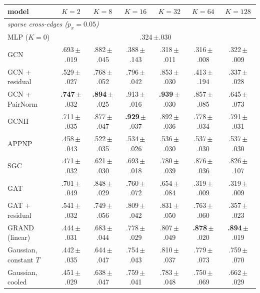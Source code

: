 \begin{tabular}{lcccccc}
\toprule
model & $K=2$ & $K=8$ & $K=16$ & $K=32$ & $K=64$ & $K=128$\\
\midrule
\multicolumn{7}{l}{\emph{sparse cross-edges ($p_x=0.05$)}}\\
MLP ($K=0$) & \multicolumn{6}{c}{.324\,{\tiny$\pm$.030}}\\
GCN & .693\,{\tiny$\pm$.019} & .882\,{\tiny$\pm$.045} & .388\,{\tiny$\pm$.143} & .318\,{\tiny$\pm$.011} & .316\,{\tiny$\pm$.008} & .322\,{\tiny$\pm$.009}\\
GCN + residual & .529\,{\tiny$\pm$.027} & .768\,{\tiny$\pm$.052} & .796\,{\tiny$\pm$.042} & .853\,{\tiny$\pm$.030} & .413\,{\tiny$\pm$.194} & .337\,{\tiny$\pm$.028}\\
GCN + PairNorm & \textbf{.747}\,{\tiny$\pm$.032} & \textbf{.894}\,{\tiny$\pm$.025} & .913\,{\tiny$\pm$.016} & \textbf{.939}\,{\tiny$\pm$.030} & .857\,{\tiny$\pm$.085} & .645\,{\tiny$\pm$.073}\\
GCNII & .711\,{\tiny$\pm$.035} & .877\,{\tiny$\pm$.047} & \textbf{.929}\,{\tiny$\pm$.037} & .892\,{\tiny$\pm$.036} & .778\,{\tiny$\pm$.034} & .791\,{\tiny$\pm$.031}\\
APPNP & .458\,{\tiny$\pm$.043} & .522\,{\tiny$\pm$.035} & .534\,{\tiny$\pm$.026} & .536\,{\tiny$\pm$.030} & .537\,{\tiny$\pm$.030} & .537\,{\tiny$\pm$.030}\\
SGC & .471\,{\tiny$\pm$.032} & .621\,{\tiny$\pm$.030} & .693\,{\tiny$\pm$.018} & .780\,{\tiny$\pm$.039} & .876\,{\tiny$\pm$.036} & .826\,{\tiny$\pm$.107}\\
GAT & .701\,{\tiny$\pm$.049} & .848\,{\tiny$\pm$.029} & .760\,{\tiny$\pm$.072} & .654\,{\tiny$\pm$.084} & .319\,{\tiny$\pm$.009} & .319\,{\tiny$\pm$.009}\\
GAT + residual & .541\,{\tiny$\pm$.032} & .749\,{\tiny$\pm$.056} & .809\,{\tiny$\pm$.042} & .831\,{\tiny$\pm$.050} & .763\,{\tiny$\pm$.060} & .357\,{\tiny$\pm$.023}\\
GRAND (linear) & .444\,{\tiny$\pm$.031} & .683\,{\tiny$\pm$.044} & .778\,{\tiny$\pm$.029} & .807\,{\tiny$\pm$.049} & \textbf{.878}\,{\tiny$\pm$.020} & \textbf{.894}\,{\tiny$\pm$.019}\\
Gaussian, constant $T$ & .442\,{\tiny$\pm$.035} & .644\,{\tiny$\pm$.047} & .754\,{\tiny$\pm$.043} & .810\,{\tiny$\pm$.037} & .779\,{\tiny$\pm$.073} & .759\,{\tiny$\pm$.070}\\
Gaussian, cooled & .451\,{\tiny$\pm$.029} & .638\,{\tiny$\pm$.047} & .759\,{\tiny$\pm$.041} & .783\,{\tiny$\pm$.048} & .750\,{\tiny$\pm$.069} & .662\,{\tiny$\pm$.029}\\

\end{tabular}
